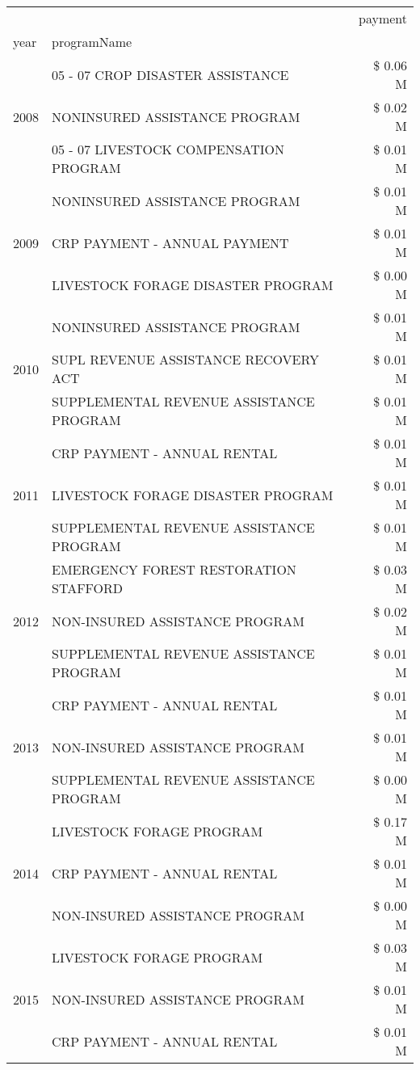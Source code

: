 \begin{tabular}{llr}
\toprule
 &  & payment \\
year & programName &  \\
\midrule
\multirow[t]{3}{*}{2008} & 05 - 07 CROP DISASTER ASSISTANCE & \$ 0.06 M \\
 & NONINSURED ASSISTANCE PROGRAM & \$ 0.02 M \\
 & 05 - 07 LIVESTOCK COMPENSATION PROGRAM & \$ 0.01 M \\
\cline{1-3}
\multirow[t]{3}{*}{2009} & NONINSURED ASSISTANCE PROGRAM & \$ 0.01 M \\
 & CRP PAYMENT - ANNUAL PAYMENT & \$ 0.01 M \\
 & LIVESTOCK FORAGE DISASTER  PROGRAM & \$ 0.00 M \\
\cline{1-3}
\multirow[t]{3}{*}{2010} & NONINSURED ASSISTANCE PROGRAM & \$ 0.01 M \\
 & SUPL REVENUE ASSISTANCE RECOVERY ACT & \$ 0.01 M \\
 & SUPPLEMENTAL REVENUE ASSISTANCE PROGRAM & \$ 0.01 M \\
\cline{1-3}
\multirow[t]{3}{*}{2011} & CRP PAYMENT - ANNUAL RENTAL & \$ 0.01 M \\
 & LIVESTOCK FORAGE DISASTER PROGRAM & \$ 0.01 M \\
 & SUPPLEMENTAL REVENUE ASSISTANCE PROGRAM & \$ 0.01 M \\
\cline{1-3}
\multirow[t]{3}{*}{2012} & EMERGENCY FOREST RESTORATION STAFFORD & \$ 0.03 M \\
 & NON-INSURED ASSISTANCE PROGRAM & \$ 0.02 M \\
 & SUPPLEMENTAL REVENUE ASSISTANCE PROGRAM & \$ 0.01 M \\
\cline{1-3}
\multirow[t]{3}{*}{2013} & CRP PAYMENT - ANNUAL RENTAL & \$ 0.01 M \\
 & NON-INSURED ASSISTANCE PROGRAM & \$ 0.01 M \\
 & SUPPLEMENTAL REVENUE ASSISTANCE PROGRAM & \$ 0.00 M \\
\cline{1-3}
\multirow[t]{3}{*}{2014} & LIVESTOCK FORAGE PROGRAM & \$ 0.17 M \\
 & CRP PAYMENT - ANNUAL RENTAL & \$ 0.01 M \\
 & NON-INSURED ASSISTANCE PROGRAM & \$ 0.00 M \\
\cline{1-3}
\multirow[t]{3}{*}{2015} & LIVESTOCK FORAGE PROGRAM & \$ 0.03 M \\
 & NON-INSURED ASSISTANCE PROGRAM & \$ 0.01 M \\
 & CRP PAYMENT - ANNUAL RENTAL & \$ 0.01 M \\

\end{tabular}
